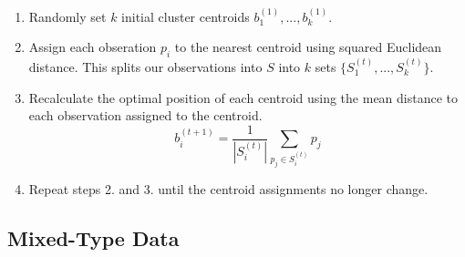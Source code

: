 \begin{enumerate} 
	\item Randomly set $k$ initial cluster centroids $b_1^{(1)}, ..., b_k^{(1)}$.
	\item Assign each obseration $p_i$ to the nearest centroid using squared Euclidean distance. This splits our observations into $S$ into $k$ sets $\{S_1^{(t)}, ..., S_k^{(t)}\}$.
	\item Recalculate the optimal position of each centroid using the mean distance to each observation assigned to the centroid. 
$$b_i^{(t+1)} = \frac{1}{|S_i^{(t)}|} \sum_{p_j \in S_i^{(t)}} p_j$$
	\item Repeat steps 2. and 3. until the centroid assignments no longer change.
\end{enumerate}

\subsection{Mixed-Type Data}












